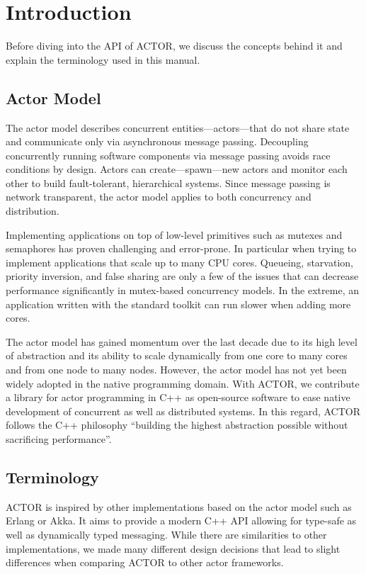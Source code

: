 \section{Introduction}

Before diving into the API of ACTOR, we discuss the concepts behind it and
explain the terminology used in this manual.

\subsection{Actor Model}

The actor model describes concurrent entities---actors---that do not share
state and communicate only via asynchronous message passing. Decoupling
concurrently running software components via message passing avoids race
conditions by design. Actors can create---spawn---new actors and monitor each
other to build fault-tolerant, hierarchical systems. Since message passing is
network transparent, the actor model applies to both concurrency and
distribution.

Implementing applications on top of low-level primitives such as mutexes and
semaphores has proven challenging and error-prone. In particular when trying to
implement applications that scale up to many CPU cores. Queueing, starvation,
priority inversion, and false sharing are only a few of the issues that can
decrease performance significantly in mutex-based concurrency models. In the
extreme, an application written with the standard toolkit can run slower when
adding more cores.

The actor model has gained momentum over the last decade due to its high level
of abstraction and its ability to scale dynamically from one core to many cores
and from one node to many nodes. However, the actor model has not yet been
widely adopted in the native programming domain. With ACTOR, we contribute a
library for actor programming in C++ as open-source software to ease native
development of concurrent as well as distributed systems. In this regard, ACTOR
follows the C++ philosophy ``building the highest abstraction possible without
sacrificing performance''.

\subsection{Terminology}

ACTOR is inspired by other implementations based on the actor model such as
Erlang or Akka. It aims to provide a modern C++ API allowing for type-safe as
well as dynamically typed messaging. While there are similarities to other
implementations, we made many different design decisions that lead to slight
differences when comparing ACTOR to other actor frameworks.


